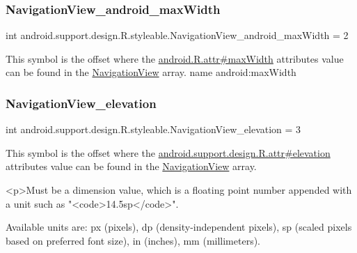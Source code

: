 \subsubsection{\texorpdfstring{Navigation\+View\+\_\+android\+\_\+max\+Width}{NavigationView\_android\_maxWidth}}
{\footnotesize\ttfamily int android.\+support.\+design.\+R.\+styleable.\+Navigation\+View\+\_\+android\+\_\+max\+Width = 2\hspace{0.3cm}{\ttfamily [static]}}

This symbol is the offset where the \hyperlink{}{android.\+R.\+attr\#max\+Width} attribute\textquotesingle{}s value can be found in the \hyperlink{classandroid_1_1support_1_1design_1_1R_1_1styleable_a277c199f371e8804c26e2cd6dbf88999}{Navigation\+View} array.  name android\+:max\+Width \mbox{\label{classandroid_1_1support_1_1design_1_1R_1_1styleable_a6b7bb0f2e0a1c1223302afa887d09d7a}} 
\subsubsection{\texorpdfstring{Navigation\+View\+\_\+elevation}{NavigationView\_elevation}}
{\footnotesize\ttfamily int android.\+support.\+design.\+R.\+styleable.\+Navigation\+View\+\_\+elevation = 3\hspace{0.3cm}{\ttfamily [static]}}

This symbol is the offset where the \hyperlink{classandroid_1_1support_1_1design_1_1R_1_1attr_a5089b576eabe15b5d530b536c68a760d}{android.\+support.\+design.\+R.\+attr\#elevation} attribute\textquotesingle{}s value can be found in the \hyperlink{classandroid_1_1support_1_1design_1_1R_1_1styleable_a277c199f371e8804c26e2cd6dbf88999}{Navigation\+View} array.

\begin{DoxyVerb}      <p>Must be a dimension value, which is a floating point number appended with a unit such as "<code>14.5sp</code>".
\end{DoxyVerb}
 Available units are\+: px (pixels), dp (density-\/independent pixels), sp (scaled pixels based on preferred font size), in (inches), mm (millimeters). 

